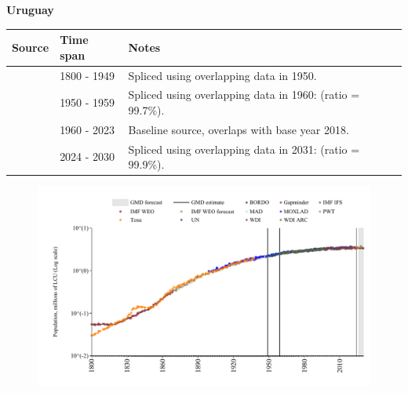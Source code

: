 \documentclass[12pt,a4paper,landscape]{article}
\begin{document}
\begin{adjustbox}{max totalsize={\paperwidth}{\paperheight},center}
\begin{minipage}[t][\textheight][t]{\textwidth}
\vspace*{0.5cm}
{}
\begin{center}
{\Large\bfseries Uruguay}
\end{center}
\vspace{0.5cm}
\begin{table}[H]
\centering
\small
\begin{tabular}{|l|l|l|}
\hline
\textbf{Source} & \textbf{Time span} & \textbf{Notes} \\
\hline
\rowcolor{white}\cite{Gapminder}& 1800 - 1949 &Spliced using overlapping data in 1950.\\
\rowcolor{lightgray}\cite{IMF_IFS}& 1950 - 1959 &Spliced using overlapping data in 1960: (ratio = 99.7\%).\\
\rowcolor{white}\cite{WDI}& 1960 - 2023 &Baseline source, overlaps with base year 2018.\\
\rowcolor{lightgray}\cite{Gapminder}& 2024 - 2030 &Spliced using overlapping data in 2031: (ratio = 99.9\%).\\
\hline
\end{tabular}
\end{table}
\begin{figure}[H]
\centering
\includegraphics[width=\textwidth,height=0.6\textheight,keepaspectratio]{graphs/URY_pop.pdf}
\end{figure}
\end{minipage}
\end{adjustbox}
\end{document}

